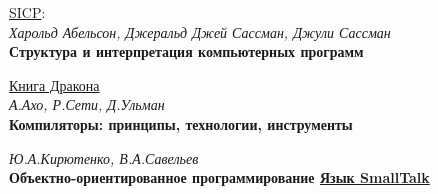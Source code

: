 \begin{thebibliography}{99}

 \href{http://newstar.rinet.ru/~goga/sicp/sicp.pdf}{SICP}:
\\
\textit{Харольд Абельсон,
Джеральд Джей Сассман,
Джули Сассман}
\\
\textbf{Структура и интерпретация компьютерных программ}

 \href{https://drive.google.com/file/d/0B0u4WeMjO894UXQ5dV9lZHZnWVE/view?usp=sharing}{Книга Дракона}
\\
\textit{А.Ахо, Р.Сети, Д.Ульман}
\\
\textbf{Компиляторы: принципы, технологии, инструменты} 

\textit{Ю.А.Кирютенко, В.А.Савельев}
\\
\textbf{Объектно-ориентированное программирование
\href{https://drive.google.com/file/d/0B0u4WeMjO894T1hjZ2xpcmZvdlU/view?usp=sharing}{Язык SmallTalk}
}

\end{thebibliography}
